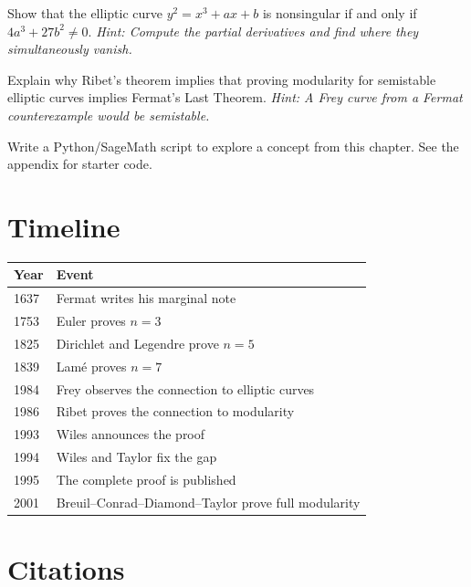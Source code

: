 \begin{exercise}[Intermediate]
Show that the elliptic curve $y^2 = x^3 + ax + b$ is nonsingular if and only if $4a^3 + 27b^2 \neq 0$. \emph{Hint: Compute the partial derivatives and find where they simultaneously vanish.}
\end{exercise}

\begin{exercise}[Challenge]
Explain why Ribet's theorem implies that proving modularity for semistable elliptic curves implies Fermat's Last Theorem. \emph{Hint: A Frey curve from a Fermat counterexample would be semistable.}
\end{exercise}


\begin{exercise}[Computational]
Write a Python/SageMath script to explore a concept from this chapter. See the appendix for starter code.
\end{exercise}

\section{Timeline}

\begin{tabularx}{\linewidth}{lX}
\toprule
\textbf{Year} & \textbf{Event} \\ \midrule
1637 & Fermat writes his marginal note \\ 
1753 & Euler proves $n = 3$ \cite{euler1783} \\ 
1825 & Dirichlet and Legendre prove $n = 5$ \\ 
1839 & Lam\'e proves $n = 7$ \\ 
1984 & Frey observes the connection to elliptic curves \cite{frey1984} \\ 
1986 & Ribet proves the connection to modularity \cite{ribet1990} \\ 
1993 & Wiles announces the proof \cite{wiles1995} \\ 
1994 & Wiles and Taylor fix the gap \cite{taylorwiles1995} \\ 
1995 & The complete proof is published \cite{wiles1995,taylorwiles1995} \\ 
2001 & Breuil--Conrad--Diamond--Taylor prove full modularity \cite{bcdt2001} \\ \bottomrule
\end{tabularx}

\section{Citations}

